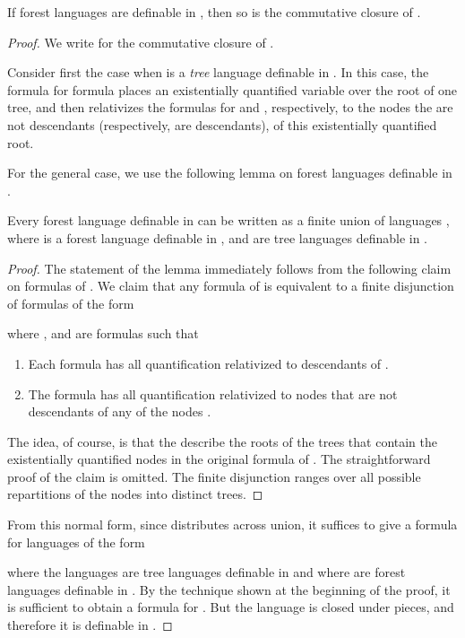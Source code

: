 \documentclass{LMCS}
\begin{document}
\begin{lem}\label{oplus-forests}
  If forest languages  are definable in \Stwo,  then so is the
  commutative closure of .
\end{lem}
\begin{proof}
We write  for the commutative closure of .


Consider first the case when  is a \emph{tree} language definable in
\Stwo. In this case, the formula for  formula places an
existentially quantified variable over the root of one tree, and then
relativizes the formulas for  and , respectively, to the nodes
the are not descendants (respectively, are descendants), of this
existentially quantified root.

For the general case, we use the following lemma on forest languages definable in .
\begin{lem}\label{lem:experimental}
	Every forest language  definable in  can be written
	as a finite union of languages , where
	 is a forest language definable in , and   are tree
	languages definable in \Stwo.
\end{lem}
\begin{proof}
	The statement of the lemma immediately follows from the following claim on formulas of . We claim that any formula    of  is equivalent to a finite disjunction of formulas of the form
	
	where  ,  and  are formulas such that
	\begin{enumerate}[]
		\item Each formula  has all  quantification  relativized to descendants of .
		\item The formula  has all quantification relativized to nodes that are not descendants of any of the nodes .
	\end{enumerate}
	The idea, of course, is that the  describe the roots of the trees
        that contain the existentially quantified nodes  in the
        original formula  of . The straightforward proof of the
        claim is omitted. The finite disjunction ranges over all possible
        repartitions of the nodes  into distinct trees.
\end{proof}



From this normal form, since  distributes across union, it
suffices to give a \Stwo formula for languages of the form
  
  where the  languages are tree languages definable in \Stwo and where
   are forest languages definable in . By the technique
  shown at the beginning of the proof, it is sufficient to obtain a formula for
  . But the language  is closed under pieces,
  and therefore it is definable in .
\end{proof}
\end{document}
